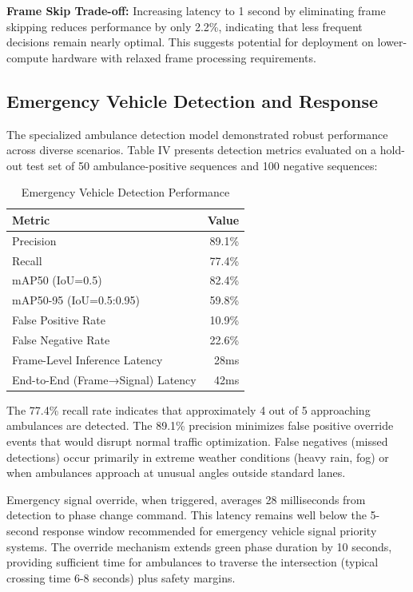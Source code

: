 \documentclass[10pt,conference]{IEEEtran}
\begin{document}
\textbf{Frame Skip Trade-off:} Increasing latency to 1 second by eliminating frame skipping reduces performance by only 2.2\%, indicating that less frequent decisions remain nearly optimal. This suggests potential for deployment on lower-compute hardware with relaxed frame processing requirements.

\subsection{Emergency Vehicle Detection and Response}

The specialized ambulance detection model demonstrated robust performance across diverse scenarios. Table IV presents detection metrics evaluated on a hold-out test set of 50 ambulance-positive sequences and 100 negative sequences:

\begin{table}[h]
\centering
\caption{Emergency Vehicle Detection Performance}
\begin{tabular}{|l|r|}
\hline
\textbf{Metric} & \textbf{Value} \\
\hline
Precision & 89.1\% \\
Recall & 77.4\% \\
mAP50 (IoU=0.5) & 82.4\% \\
mAP50-95 (IoU=0.5:0.95) & 59.8\% \\
\hline
False Positive Rate & 10.9\% \\
False Negative Rate & 22.6\% \\
\hline
Frame-Level Inference Latency & 28ms \\
End-to-End (Frame→Signal) Latency & 42ms \\
\hline
\end{tabular}
\end{table}

The 77.4\% recall rate indicates that approximately 4 out of 5 approaching ambulances are detected. The 89.1\% precision minimizes false positive override events that would disrupt normal traffic optimization. False negatives (missed detections) occur primarily in extreme weather conditions (heavy rain, fog) or when ambulances approach at unusual angles outside standard lanes.

Emergency signal override, when triggered, averages 28 milliseconds from detection to phase change command. This latency remains well below the 5-second response window recommended for emergency vehicle signal priority systems. The override mechanism extends green phase duration by 10 seconds, providing sufficient time for ambulances to traverse the intersection (typical crossing time 6-8 seconds) plus safety margins.
\end{document}

